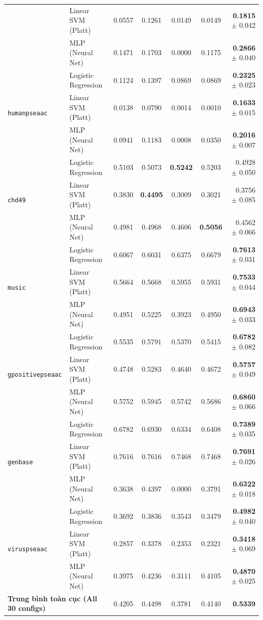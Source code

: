 \documentclass[10pt,a4paper,twoside]{article}
\begin{document}
\begin{table}[H]
{\begin{tabular}{llccccr}
 & Linear SVM (Platt) & 0.0557 & 0.1261 & 0.0149 & 0.0149 & \textbf{0.1815} $\pm$ 0.042 \\
 & MLP (Neural Net) & 0.1471 & 0.1703 & 0.0000 & 0.1175 & \textbf{0.2866} $\pm$ 0.040 \\
\midrule
\multirow{3}{*}{\texttt{humanpseaac}} & Logistic Regression & 0.1124 & 0.1397 & 0.0869 & 0.0869 & \textbf{0.2325} $\pm$ 0.023 \\
 & Linear SVM (Platt) & 0.0138 & 0.0790 & 0.0014 & 0.0010 & \textbf{0.1633} $\pm$ 0.015 \\
 & MLP (Neural Net) & 0.0941 & 0.1183 & 0.0008 & 0.0350 & \textbf{0.2016} $\pm$ 0.007 \\
\midrule
\multirow{3}{*}{\texttt{chd49}} & Logistic Regression & 0.5103 & 0.5073 & \textbf{0.5242} & 0.5203 & 0.4928 $\pm$ 0.050 \\
 & Linear SVM (Platt) & 0.3830 & \textbf{0.4495} & 0.3009 & 0.3021 & 0.3756 $\pm$ 0.085 \\
 & MLP (Neural Net) & 0.4981 & 0.4968 & 0.4606 & \textbf{0.5056} & 0.4562 $\pm$ 0.066 \\
\midrule
\multirow{3}{*}{\texttt{music}} & Logistic Regression & 0.6067 & 0.6031 & 0.6375 & 0.6679 & \textbf{0.7613} $\pm$ 0.031 \\
 & Linear SVM (Platt) & 0.5664 & 0.5668 & 0.5955 & 0.5931 & \textbf{0.7533} $\pm$ 0.044 \\
 & MLP (Neural Net) & 0.4951 & 0.5225 & 0.3923 & 0.4950 & \textbf{0.6943} $\pm$ 0.033 \\
\midrule
\multirow{3}{*}{\texttt{gpositivepseaac}} & Logistic Regression & 0.5535 & 0.5791 & 0.5370 & 0.5415 & \textbf{0.6782} $\pm$ 0.082 \\
 & Linear SVM (Platt) & 0.4748 & 0.5283 & 0.4640 & 0.4672 & \textbf{0.5757} $\pm$ 0.049 \\
 & MLP (Neural Net) & 0.5752 & 0.5945 & 0.5742 & 0.5686 & \textbf{0.6860} $\pm$ 0.066 \\
\midrule
\multirow{3}{*}{\texttt{genbase}} & Logistic Regression & 0.6782 & 0.6930 & 0.6334 & 0.6408 & \textbf{0.7389} $\pm$ 0.035 \\
 & Linear SVM (Platt) & 0.7616 & 0.7616 & 0.7468 & 0.7468 & \textbf{0.7691} $\pm$ 0.026 \\
 & MLP (Neural Net) & 0.3638 & 0.4397 & 0.0000 & 0.3791 & \textbf{0.6322} $\pm$ 0.018 \\
\midrule
\multirow{3}{*}{\texttt{viruspseaac}} & Logistic Regression & 0.3692 & 0.3836 & 0.3543 & 0.3479 & \textbf{0.4982} $\pm$ 0.040 \\
 & Linear SVM (Platt) & 0.2857 & 0.3378 & 0.2353 & 0.2321 & \textbf{0.3418} $\pm$ 0.069 \\
 & MLP (Neural Net) & 0.3975 & 0.4236 & 0.3111 & 0.4105 & \textbf{0.4870} $\pm$ 0.025 \\
\midrule
\multicolumn{2}{l}{\textbf{Trung bình toàn cục (All 30 configs)}} & 0.4205 & 0.4498 & 0.3781 & 0.4140 & \textbf{0.5339} \\
\bottomrule
\end{tabular}%
}
\end{table}
\clearpage
\end{document}
